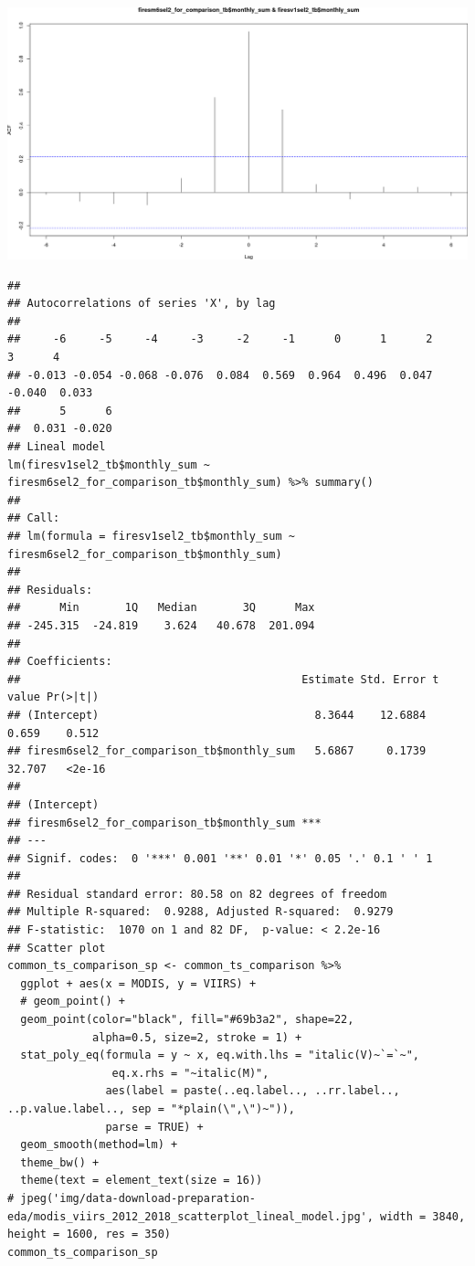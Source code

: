 \documentclass[10pt,landscape,a3paper]{article}
\begin{document}
\begin{center}\includegraphics[width=0.75\linewidth]{img/data-download-preparation-eda/unnamed-chunk-1-8} \end{center}

\begin{verbatim}
## 
## Autocorrelations of series 'X', by lag
## 
##     -6     -5     -4     -3     -2     -1      0      1      2      3      4 
## -0.013 -0.054 -0.068 -0.076  0.084  0.569  0.964  0.496  0.047 -0.040  0.033 
##      5      6 
##  0.031 -0.020
## Lineal model
lm(firesv1sel2_tb$monthly_sum ~ firesm6sel2_for_comparison_tb$monthly_sum) %>% summary()
## 
## Call:
## lm(formula = firesv1sel2_tb$monthly_sum ~ firesm6sel2_for_comparison_tb$monthly_sum)
## 
## Residuals:
##      Min       1Q   Median       3Q      Max 
## -245.315  -24.819    3.624   40.678  201.094 
## 
## Coefficients:
##                                           Estimate Std. Error t value Pr(>|t|)
## (Intercept)                                 8.3644    12.6884   0.659    0.512
## firesm6sel2_for_comparison_tb$monthly_sum   5.6867     0.1739  32.707   <2e-16
##                                              
## (Intercept)                                  
## firesm6sel2_for_comparison_tb$monthly_sum ***
## ---
## Signif. codes:  0 '***' 0.001 '**' 0.01 '*' 0.05 '.' 0.1 ' ' 1
## 
## Residual standard error: 80.58 on 82 degrees of freedom
## Multiple R-squared:  0.9288, Adjusted R-squared:  0.9279 
## F-statistic:  1070 on 1 and 82 DF,  p-value: < 2.2e-16
## Scatter plot
common_ts_comparison_sp <- common_ts_comparison %>%
  ggplot + aes(x = MODIS, y = VIIRS) +
  # geom_point() +
  geom_point(color="black", fill="#69b3a2", shape=22,
             alpha=0.5, size=2, stroke = 1) +
  stat_poly_eq(formula = y ~ x, eq.with.lhs = "italic(V)~`=`~",
                eq.x.rhs = "~italic(M)",
               aes(label = paste(..eq.label.., ..rr.label.., ..p.value.label.., sep = "*plain(\",\")~")),
               parse = TRUE) + 
  geom_smooth(method=lm) +
  theme_bw() +
  theme(text = element_text(size = 16))
# jpeg('img/data-download-preparation-eda/modis_viirs_2012_2018_scatterplot_lineal_model.jpg', width = 3840, height = 1600, res = 350)
common_ts_comparison_sp
\end{verbatim}
\end{document}
